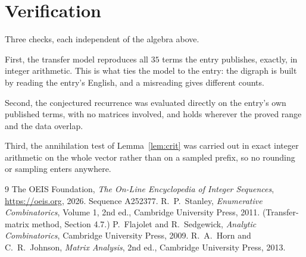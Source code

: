 \documentclass[11pt,a4paper]{article}
\theoremstyle{plain}
\theoremstyle{definition}
\begin{document}
\section{Verification}

Three checks, each independent of the algebra above.

First, the transfer model reproduces all $35$ terms the entry publishes, exactly, in
integer arithmetic. This is what ties the model to the entry: the digraph is built by reading
the entry's English, and a misreading gives different counts.

Second, the conjectured recurrence was evaluated directly on the entry's own published terms,
with no matrices involved, and holds wherever the proved range and the data overlap.

Third, the annihilation test of Lemma~\ref{lem:crit} was carried out in exact integer
arithmetic on the whole vector rather than on a sampled prefix, so no rounding or sampling
enters anywhere.

\begin{thebibliography}{9}
 The OEIS Foundation, \emph{The On-Line Encyclopedia of Integer
Sequences}, \url{https://oeis.org}, 2026. Sequence A252377.
 R.~P.~Stanley, \emph{Enumerative Combinatorics}, Volume 1, 2nd ed.,
Cambridge University Press, 2011. (Transfer-matrix method, Section 4.7.)
 P.~Flajolet and R.~Sedgewick, \emph{Analytic Combinatorics}, Cambridge
University Press, 2009.
 R.~A.~Horn and C.~R.~Johnson, \emph{Matrix Analysis}, 2nd ed., Cambridge
University Press, 2013.
\end{thebibliography}
\end{document}
